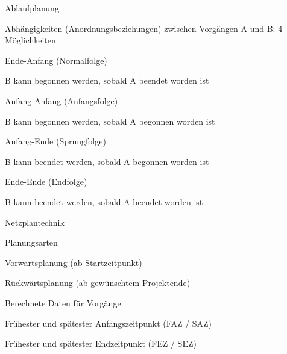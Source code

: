 \documentclass[a4paper]{article}
\begin{document}
\begin{multicols}{3}
  Ablaufplanung
  \begin{itemize*}
    \item Abhängigkeiten (Anordnungsbeziehungen) zwischen Vorgängen A und B: 4 Möglichkeiten
          \begin{itemize*}
            \item Ende-Anfang (Normalfolge)
                  \begin{itemize*}
                    \item B kann begonnen werden, sobald A beendet worden ist
                  \end{itemize*}
            \item Anfang-Anfang (Anfangsfolge)
                  \begin{itemize*}
                    \item B kann begonnen werden, sobald A begonnen worden ist
                  \end{itemize*}
            \item Anfang-Ende (Sprungfolge)
                  \begin{itemize*}
                    \item B kann beendet werden, sobald A begonnen worden ist
                  \end{itemize*}
            \item Ende-Ende (Endfolge)
                  \begin{itemize*}
                    \item B kann beendet werden, sobald A beendet worden ist
                  \end{itemize*}
          \end{itemize*}
    \item Netzplantechnik
          \begin{itemize*}
            \item Planungsarten
                  \begin{itemize*}
                    \item Vorwärtsplanung (ab Startzeitpunkt)
                    \item Rückwärtsplanung (ab gewünschtem Projektende)
                  \end{itemize*}
            \item Berechnete Daten für Vorgänge
                  \begin{itemize*}
                    \item Frühester und spätester Anfangszeitpunkt (FAZ / SAZ)
                    \item Frühester und spätester Endzeitpunkt (FEZ / SEZ)

\end{itemize*}
\end{itemize*}
\end{itemize*}
\end{multicols}
\end{document}

